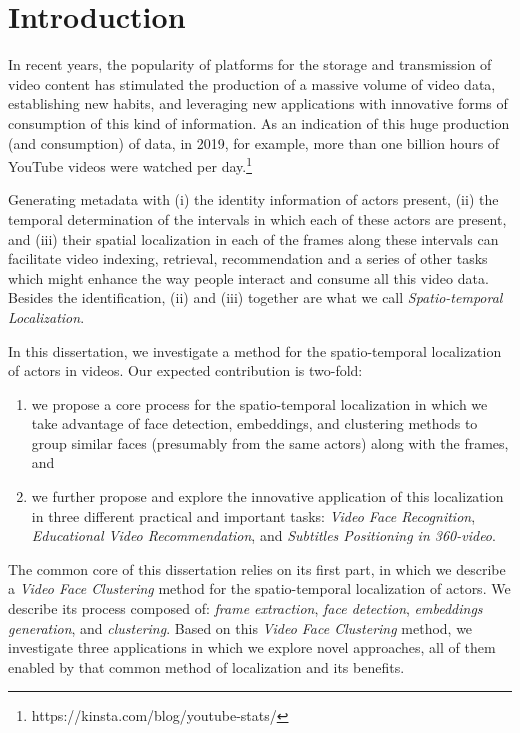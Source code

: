 \newpage

\chapter{Introduction}
\label{chap:introduction}

In recent years, the popularity of platforms for the storage and transmission of video content has stimulated the production of a massive volume of video data, establishing new habits, and leveraging new applications with innovative forms of consumption of this kind of information. As an indication of this huge production (and consumption) of data, in 2019, for example, more than one billion hours of YouTube videos were watched per day.\footnote{https://kinsta.com/blog/youtube-stats/}


Generating metadata with (i) the identity information of actors present, (ii) the temporal determination of the intervals in which each of these actors are present, and (iii) their spatial localization in each of the frames along these intervals can facilitate video indexing, retrieval, recommendation and a series of other tasks which might enhance the way people interact and consume all this video data. Besides the identification, (ii) and (iii) together are what we call \textit{Spatio-temporal Localization}. 

In this dissertation, we investigate a method for the spatio-temporal localization of actors in videos. Our expected contribution is two-fold: 
\begin{enumerate}
\item we propose a core process for the spatio-temporal localization in which we take advantage of face detection, embeddings, and clustering methods to group similar faces (presumably from the same actors) along with the frames, and \item we further propose and explore the innovative application of this localization in three different practical and important tasks: \emph{Video Face Recognition}, \emph{Educational Video Recommendation}, and \emph{Subtitles Positioning in 360-video}.  
\end{enumerate}

The common core of this dissertation relies on its first part, in which we describe a \textit{Video Face Clustering} method for the spatio-temporal localization of actors. We describe its process composed of: \textit{frame extraction}, \textit{face detection}, \textit{embeddings generation}, and \textit{clustering}. 
Based on this \emph{Video Face Clustering} method, we investigate three applications in which we explore novel approaches, all of them enabled by that common method of localization and its benefits. 

